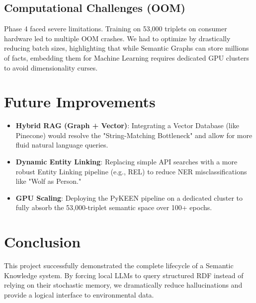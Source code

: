 \documentclass[11pt]{article}
\begin{document}
\subsection{Computational Challenges (OOM)}
Phase 4 faced severe limitations. Training on 53,000 triplets on consumer hardware led to multiple OOM crashes. We had to optimize by drastically reducing batch sizes, highlighting that while Semantic Graphs can store millions of facts, embedding them for Machine Learning requires dedicated GPU clusters to avoid dimensionality curses.

\section{Future Improvements}
\begin{itemize}
    \item \textbf{Hybrid RAG (Graph + Vector)}: Integrating a Vector Database (like Pinecone) would resolve the "String-Matching Bottleneck" and allow for more fluid natural language queries.
    \item \textbf{Dynamic Entity Linking}: Replacing simple API searches with a more robust Entity Linking pipeline (e.g., REL) to reduce NER misclassifications like "Wolf as Person."
    \item \textbf{GPU Scaling}: Deploying the PyKEEN pipeline on a dedicated cluster to fully absorb the 53,000-triplet semantic space over 100+ epochs.
\end{itemize}

\section{Conclusion}
This project successfully demonstrated the complete lifecycle of a Semantic Knowledge system. By forcing local LLMs to query structured RDF instead of relying on their stochastic memory, we dramatically reduce hallucinations and provide a logical interface to environmental data.
\end{document}
